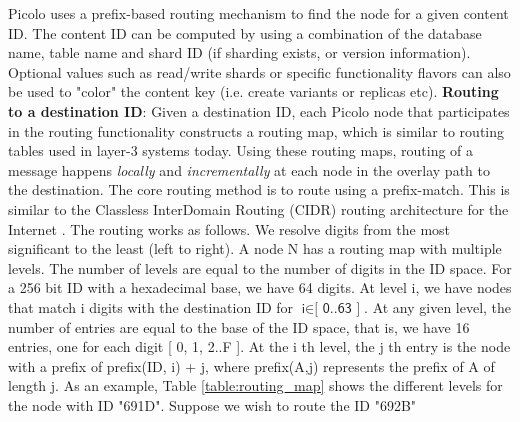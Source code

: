 \textsf{Picolo} uses a prefix-based routing mechanism to find the node for a given content ID. The content ID can be computed by using a combination of the database name, table name and shard ID (if sharding exists, or version information). Optional values such as read/write shards or specific functionality flavors can also be used to "color" the content key (i.e. create variants or replicas etc).
\newline\newline
\textbf{Routing to a destination ID}:
Given a destination ID, each \textsf{Picolo} node that participates in the routing functionality constructs a routing map, which
is similar to routing tables used in layer-3 systems today. Using these routing maps, routing of a message happens {\em
locally} and {\em incrementally} at each node in the overlay path to the destination. The core routing method is to
route using a prefix-match. This is similar to the Classless InterDomain Routing (CIDR) routing architecture for the Internet
\cite{cidr_rfc}. The routing works as follows. We resolve digits from the most significant to the least (left to right). A node N has a
routing map with multiple levels. The number of levels are equal to the number of digits in the ID space. For a 256 bit
ID with a hexadecimal base, we have 64 digits. At level \textsf{i}, we have nodes that match \textsf{i} digits with the destination ID for \( \textsf{i} \in \textsf{[ 0..63 ]}\). At any given level, the number of entries are equal to the base of the ID space, that is, we have 16 entries, one for
each digit \textsf{[ 0, 1, 2..F ]}. At the \textsf{i} th level, the \textsf{j} th entry is the node with a prefix of \textsf{prefix(ID, i) + j}, where \textsf{prefix(A,j)} represents the prefix of \textsf{A} of length \textsf{j}. As an example, Table \ref{table:routing_map} shows the different levels for the node with ID "691D".  Suppose we wish to route the ID "692B"
